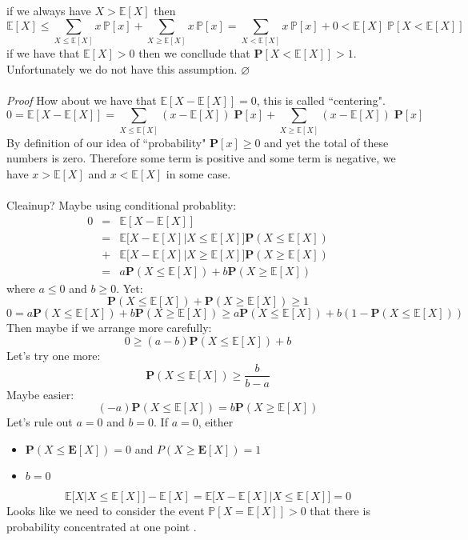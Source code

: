 \documentclass[12pt]{article}
\begin{document}
{if we always have $X > \mathbb{E}[X]$ then
$$ \mathbb{E}[X] \leq \sum_{X \leq \mathbb{E}[X]} x\,\mathbb{P}[x] +  \sum_{X \geq \mathbb{E}[X]} x\,\mathbb{P}[x] = \sum_{X <  \mathbb{E}[X]} x\,\mathbb{P}[x] + 0
 < \mathbb{E}[X] \; \mathbb{P}[X < \mathbb{E}[X]]$$
if we have that $\mathbb{E}[X] > 0$ then we concllude that $\mathbf{P}[X < \mathbb{E}[X]] > 1$.  Unfortunately we do not have this assumption. \hfill $\varnothing$\\ \\
\textit{Proof} How about we have that $\mathbb{E}[X - \mathbb{E}[X]] = 0$, this is called ``centering".
$$ 0 = \mathbb{E}[X - \mathbb{E}[X]] = \sum_{X \leq \mathbb{E}[X]} (x - \mathbb{E}[X])\;\mathbf{P}[x]
+ \sum_{X \geq \mathbb{E}[X]} (x - \mathbb{E}[X])\;\mathbf{P}[x]$$  
By definition of our idea of ``probability" $\mathbf{P}[x] \geq 0$ and yet the total of these numbers is zero.  Therefore some term is positive and some term is negative, we have $x > \mathbb{E}[X]$ and $x < \mathbb{E}[X]$ in some case. \\ \\
Cleainup?  Maybe using conditional probablity:
\begin{eqnarray*} 0  &=& \mathbb{E}[X - \mathbb{E}[X]] \\ 
&=& \mathbb{E}\Big[X - \mathbb{E}[X] | X \leq \mathbb{E}[X]\Big] \mathbf{P}( X \leq \mathbb{E}[X]) \\
&+& \mathbb{E}\Big[X - \mathbb{E}[X] | X \geq \mathbb{E}[X]\Big] \mathbf{P}( X \geq \mathbb{E}[X]) \\
&=& a\mathbf{P}( X \leq \mathbb{E}[X]) + b \mathbf{P}( X \geq \mathbb{E}[X])
\end{eqnarray*}
where $a \leq 0$ and $b \geq 0$.  Yet:
$$\mathbf{P}( X \leq \mathbb{E}[X]) +  \mathbf{P}( X \geq \mathbb{E}[X]) \geq 1 $$
$$ 0 = a\mathbf{P}( X \leq \mathbb{E}[X]) + b \mathbf{P}( X \geq \mathbb{E}[X])
\geq a\mathbf{P}( X \leq \mathbb{E}[X]) + b (1 -  \mathbf{P}( X \leq \mathbb{E}[X]))$$
Then maybe if we arrange more carefully:
$$ 0 \geq (a - b)\mathbf{P}(X \leq \mathbb{E}[X]) + b $$
Let's try one more:
$$ \mathbf{P}(X \leq \mathbb{E}[X]) \geq \frac{b}{b-a} $$
Maybe easier:
$$ (-a)\mathbf{P}( X \leq \mathbb{E}[X]) = b \mathbf{P}( X \geq \mathbb{E}[X])$$
Let's rule out $a = 0$ and $b = 0$.  If $a = 0$, either
\begin{itemize}
\item $\mathbf{P}(X \leq \mathbf{E}[X]) = 0$ and $P (X \geq \mathbf{E}[X]) = 1$
\item $b = 0 $
\end{itemize}
$$  \mathbb{E}\Big[X  | X \leq \mathbb{E}[X]\Big] -  \mathbb{E}[X]  = \mathbb{E}\Big[X - \mathbb{E}[X] | X \leq \mathbb{E}[X]\Big] = 0 $$
Looks like we need to consider the event $\mathbb{P}[ X = \mathbb{E}[X]] > 0$ that there is probability concentrated at one point .

}
\end{document}

